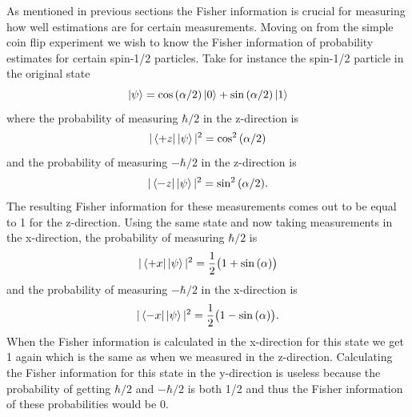 \documentclass[twocolumn]{article}
\begin{document}
As mentioned in previous sections the Fisher information is crucial for measuring how well estimations are for certain measurements. Moving on from the simple coin flip experiment we wish to know the Fisher information of probability estimates for certain spin-1/2 particles. Take for instance the spin-1/2 particle in the original state
\begin{equation}
\ket{\psi}=\cos{(\alpha/2)}\ket{0}+\sin{(\alpha/2)}\ket{1}
\end{equation}
where the probability of measuring $\hbar/2$ in the z-direction is
\begin{equation}
|\bra{+z}\ket{\psi}|^2=\cos^2{(\alpha/2)}
\end{equation}
and the probability of measuring $-\hbar/2$ in the z-direction is
\begin{equation}
|\bra{-z}\ket{\psi}|^2=\sin^2{(\alpha/2)}.
\end{equation}
The resulting Fisher information for these measurements comes out to be equal to 1 for the z-direction. Using the same state and now taking measurements in the x-direction, the probability of measuring $\hbar/2$ is
\begin{equation}
|\bra{+x}\ket{\psi}|^2=\frac{1}{2}\big(1+\sin{(\alpha)}\big)
\end{equation}
and the probability of measuring $-\hbar/2$ in the x-direction is
\begin{equation}
|\bra{-x}\ket{\psi}|^2=\frac{1}{2}\big(1-\sin{(\alpha)}\big).
\end{equation}
When the Fisher information is calculated in the x-direction for this state we get 1 again which is the same as when we measured in the z-direction. Calculating the Fisher information for this state in the y-direction is useless because the probability of getting $\hbar/2$ and $-\hbar/2$ is both 1/2 and thus the Fisher information of these probabilities would be 0.
\end{document}
